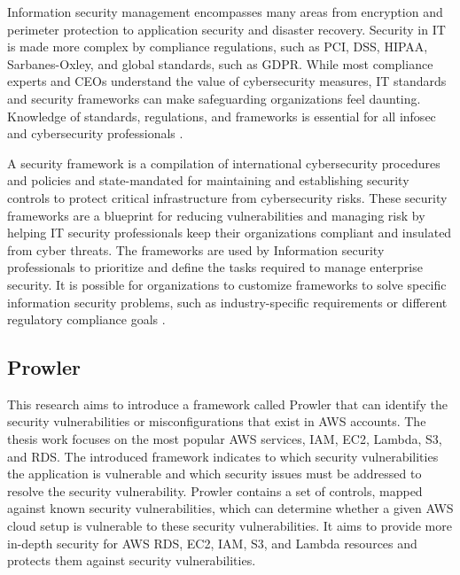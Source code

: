 \par Information security management encompasses many areas from encryption and perimeter protection to application security and disaster recovery.
Security in IT is made more complex by compliance regulations, such as PCI, DSS, HIPAA, Sarbanes-Oxley, and global standards, such as GDPR. While most compliance experts and CEOs understand the value of cybersecurity measures, IT standards and security frameworks can make safeguarding organizations feel daunting.
Knowledge of standards, regulations, and frameworks is
essential for all infosec and cybersecurity professionals
\cite{48}.

\par A security framework is a compilation of international cybersecurity procedures and policies and state-mandated for maintaining and establishing security controls to protect critical infrastructure from cybersecurity risks.
These security frameworks are a blueprint for reducing vulnerabilities and managing risk by helping IT security professionals keep their organizations compliant and insulated from cyber threats.
The frameworks are used by Information security professionals to prioritize and define the tasks required to manage enterprise security.
It is possible for organizations to customize frameworks
to solve specific information security problems, such as
industry-specific requirements or different regulatory compliance goals \cite{48}.

\subsection{Prowler}

\par This research aims to introduce a framework called Prowler that can identify the security vulnerabilities or misconfigurations that exist in AWS accounts.
The thesis work focuses on the most popular AWS services,
IAM,
EC2, Lambda, S3, and RDS.
The introduced framework indicates to which security vulnerabilities the application is vulnerable and which security issues must be addressed to resolve the security vulnerability.
Prowler contains a set of controls, mapped against known security vulnerabilities, which can determine whether a given AWS cloud setup is vulnerable to these security vulnerabilities.
It aims to provide more in-depth security for AWS RDS,
EC2, IAM, S3, and Lambda resources and protects them
against security vulnerabilities.\\

